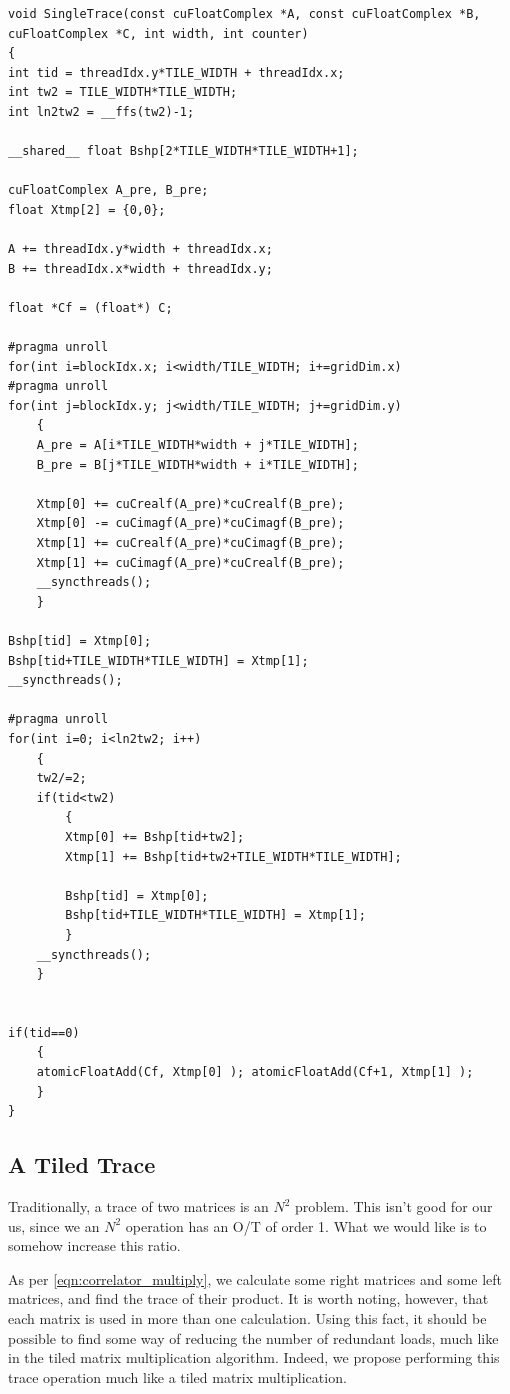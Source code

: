 \documentclass[a4paper,12pt]{report}
\begin{document}
\begin{lstlisting}[caption=Single Tracing Kernel, label=lst:single_trace]
void SingleTrace(const cuFloatComplex *A, const cuFloatComplex *B, cuFloatComplex *C, int width, int counter)
{
int tid = threadIdx.y*TILE_WIDTH + threadIdx.x;
int tw2 = TILE_WIDTH*TILE_WIDTH;
int ln2tw2 = __ffs(tw2)-1;

__shared__ float Bshp[2*TILE_WIDTH*TILE_WIDTH+1];

cuFloatComplex A_pre, B_pre;
float Xtmp[2] = {0,0};

A += threadIdx.y*width + threadIdx.x;
B += threadIdx.x*width + threadIdx.y;

float *Cf = (float*) C;

#pragma unroll
for(int i=blockIdx.x; i<width/TILE_WIDTH; i+=gridDim.x)
#pragma unroll
for(int j=blockIdx.y; j<width/TILE_WIDTH; j+=gridDim.y)
	{
	A_pre = A[i*TILE_WIDTH*width + j*TILE_WIDTH];	
	B_pre = B[j*TILE_WIDTH*width + i*TILE_WIDTH];

	Xtmp[0] += cuCrealf(A_pre)*cuCrealf(B_pre);
	Xtmp[0] -= cuCimagf(A_pre)*cuCimagf(B_pre);
	Xtmp[1] += cuCrealf(A_pre)*cuCimagf(B_pre); 
	Xtmp[1] += cuCimagf(A_pre)*cuCrealf(B_pre);
	__syncthreads();
	}

Bshp[tid] = Xtmp[0];
Bshp[tid+TILE_WIDTH*TILE_WIDTH] = Xtmp[1];
__syncthreads();

#pragma unroll
for(int i=0; i<ln2tw2; i++)
	{
	tw2/=2;
	if(tid<tw2)
		{
		Xtmp[0] += Bshp[tid+tw2];
		Xtmp[1] += Bshp[tid+tw2+TILE_WIDTH*TILE_WIDTH];

		Bshp[tid] = Xtmp[0]; 
		Bshp[tid+TILE_WIDTH*TILE_WIDTH] = Xtmp[1];
		}
	__syncthreads();
	}


if(tid==0)
	{
	atomicFloatAdd(Cf, Xtmp[0] ); atomicFloatAdd(Cf+1, Xtmp[1] );
	}
}
\end{lstlisting}



\subsection{A Tiled Trace}

Traditionally, a trace of two matrices is an $N^2$ problem.
This isn't good for our us, since we an $N^2$ operation has an O/T of order 1.
What we would like is to somehow increase this ratio.

As per \ref{eqn:correlator_multiply}, we calculate some right matrices and some left matrices, and find the trace of their product.
It is worth noting, however, that each matrix is used in more than one calculation.
Using this fact, it should be possible to find some way of reducing the number of redundant loads, much like in the tiled matrix multiplication algorithm.
Indeed, we propose performing this trace operation much like a tiled matrix multiplication.
\end{document}
